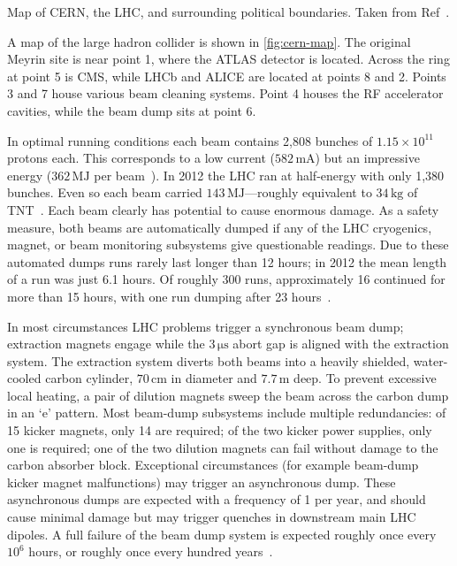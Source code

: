 \begin{cfig}
  \caption[CERN Map]{Map of CERN, the LHC, and surrounding political boundaries. Taken from Ref~\cite{cern-map}.}
  \label{fig:cern-map}
\end{cfig}

A map of the large hadron collider is shown in \cref{fig:cern-map}.
The original Meyrin site is near point 1, where the ATLAS detector is located.
Across the ring at point 5 is CMS, while LHCb and ALICE are located at points 8 and 2.
Points 3 and 7 house various beam cleaning systems.
Point 4 houses the RF accelerator cavities, while the beam dump sits at point 6.

In optimal running conditions each beam contains 2,808 bunches of $1.15 \times 10^{11}$ protons each.
This corresponds to a low current ($582\,\text{mA}$) but an impressive energy ($362\,\text{MJ}$ per beam~\cite{lhc-machine}).
In 2012 the LHC ran at half-energy with only 1,380 bunches.
Even so each beam carried $143\,\text{MJ}$---roughly equivalent to $34\,\text{kg}$ of TNT~\cite{lhc-run1}.
Each beam clearly has potential to cause enormous damage.
As a safety measure, both beams are automatically dumped if any of the LHC cryogenics, magnet, or beam monitoring subsystems give questionable readings.
Due to these automated dumps runs rarely last longer than 12 hours; in 2012 the mean length of a run was just 6.1 hours.
Of roughly 300 runs, approximately 16 continued for more than 15 hours, with one run dumping after 23 hours~\cite{lhc-run1}.

In most circumstances LHC problems trigger a synchronous beam dump; extraction magnets engage while the $3\,\mathrm{\mu s}$ abort gap is aligned with the extraction system.
The extraction system diverts both beams into a heavily shielded, water-cooled carbon cylinder, $70\,\mathrm{cm}$ in diameter and $7.7\,\text{m}$ deep.
To prevent excessive local heating, a pair of dilution magnets sweep the beam across the carbon dump in an `e' pattern.
Most beam-dump subsystems include multiple redundancies: of 15 kicker magnets, only 14 are required; of the two kicker power supplies, only one is required; one of the two dilution magnets can fail without damage to the carbon absorber block.
Exceptional circumstances (for example beam-dump kicker magnet malfunctions) may trigger an asynchronous dump.
These asynchronous dumps are expected with a frequency of 1 per year, and should cause minimal damage but may trigger quenches in downstream main LHC dipoles.
A full failure of the beam dump system is expected roughly once every $10^6$ hours, or roughly once every hundred years~\cite{lhc-machine}.

